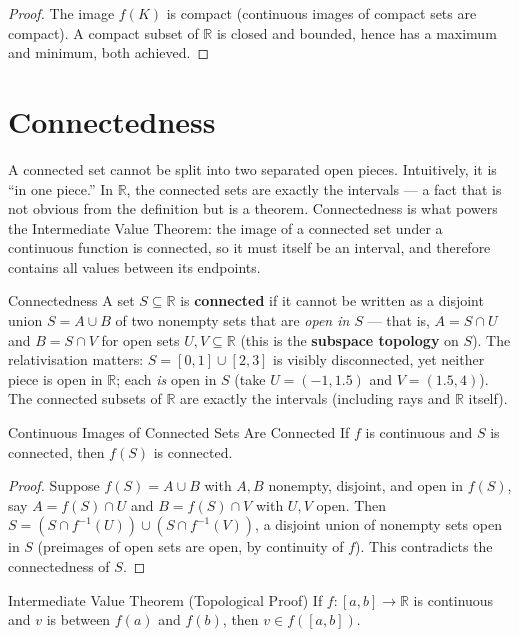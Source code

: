\documentclass[12pt, openany]{book}
\theoremstyle{plain}
\theoremstyle{definition}
\theoremstyle{remark}
\newcommand{\R}{\mathbb{R}}
\begin{document}
\begin{proof}
The image $f(K)$ is compact (continuous images of compact sets are compact). A compact subset of $\R$ is closed and bounded, hence has a maximum and minimum, both achieved.
\end{proof}

\section{Connectedness}

A connected set cannot be split into two separated open pieces.  Intuitively, it is ``in one piece.''  In $\R$, the connected sets are exactly the intervals --- a fact that is not obvious from the definition but is a theorem.  Connectedness is what powers the Intermediate Value Theorem: the image of a connected set under a continuous function is connected, so it must itself be an interval, and therefore contains all values between its endpoints.

\begin{defbox}{Connectedness}
A set $S \subseteq \R$ is \textbf{connected} if it cannot be written as a disjoint union $S = A \cup B$ of two nonempty sets that are \emph{open in $S$} --- that is, $A = S \cap U$ and $B = S \cap V$ for open sets $U, V \subseteq \R$ (this is the \textbf{subspace topology} on $S$). The relativisation matters: $S = [0,1] \cup [2,3]$ is visibly disconnected, yet neither piece is open in $\R$; each \emph{is} open in $S$ (take $U = (-1, 1.5)$ and $V = (1.5, 4)$). The connected subsets of $\R$ are exactly the intervals (including rays and $\R$ itself).
\end{defbox}
\color{black}

\begin{thmbox}{Continuous Images of Connected Sets Are Connected}
If $f$ is continuous and $S$ is connected, then $f(S)$ is connected.
\end{thmbox}
\color{black}

\begin{proof}
Suppose $f(S) = A \cup B$ with $A, B$ nonempty, disjoint, and open in $f(S)$, say $A = f(S) \cap U$ and $B = f(S) \cap V$ with $U, V$ open. Then $S = (S \cap f^{-1}(U)) \cup (S \cap f^{-1}(V))$, a disjoint union of nonempty sets open in $S$ (preimages of open sets are open, by continuity of $f$). This contradicts the connectedness of $S$.
\end{proof}

\begin{corbox}{Intermediate Value Theorem (Topological Proof)}
If $f : [a,b] \to \R$ is continuous and $v$ is between $f(a)$ and $f(b)$, then $v \in f([a,b])$.
\end{corbox}
\color{black}
\end{document}

